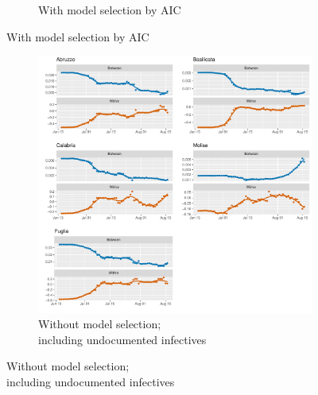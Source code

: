 \documentclass[12pt]{article}
\begin{document}
\begin{appendices}
\begin{figure}[H]
\begin{subfigure}{\textwidth}
    	      \caption{With model selection by AIC}
    	      \label{fig:beta_between_over_time_sud_aic}
    	    \end{subfigure}
    	\end{figure}
        \begin{figure}[H]\ContinuedFloat
    	    \begin{subfigure}{\textwidth}
    	      \centering
    	      \includegraphics[width=\linewidth]{output/model_between_lag14_betas_Sud_UndocQuadratic_rolling.pdf}
    	      \caption{Without model selection; \\ including undocumented infectives}
    	      \label{fig:beta_between_over_time_sud_regular_undoc}
    	    \end{subfigure}
        \end{figure}
        \begin{figure}[H]\ContinuedFloat
    	    \begin{subfigure}{\textwidth}
    	      \centering

\end{subfigure}
\end{figure}
\end{appendices}
\end{document}
